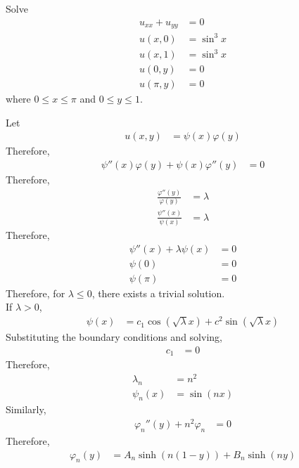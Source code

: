 \documentclass[titlepage, fleqn, a4paper, 12pt, twoside]{article}
\theoremstyle{definition}
\theoremstyle{theorem}
\begin{document}
\begin{question}
	Solve
	\begin{align*}
		u_{x x} + u_{y y} & = 0        \\
		u(x,0)            & = \sin^3 x \\
		u(x,1)            & = \sin^3 x \\
		u(0,y)            & = 0        \\
		u(\pi,y)          & = 0
	\end{align*}
	where $0 \le x \le \pi$ and $0 \le y \le 1$.
\end{question}

\begin{solution}
	Let
	\begin{align*}
		u(x,y) & = \psi(x) \varphi(y)
	\end{align*}
	Therefore,
	\begin{align*}
		\psi''(x) \varphi(y) + \psi(x) \varphi''(y) & = 0
	\end{align*}
	Therefore,
	\begin{align*}
		\frac{\varphi''(y)}{\varphi(y)} & = \lambda \\
		\frac{\psi''(x)}{\psi(x)}       & = \lambda
	\end{align*}
	Therefore,
	\begin{align*}
		\psi''(x) + \lambda \psi(x) & = 0 \\
		\psi(0)                     & = 0 \\
		\psi(\pi)                   & = 0
	\end{align*}
	Therefore, for $\lambda \le 0$, there exists a trivial solution.\\
	If $\lambda > 0$,
	\begin{align*}
		\psi(x) & = c_1 \cos\left( \sqrt{\lambda} x \right) + c^2 \sin\left( \sqrt{\lambda} x \right)
	\end{align*}
	Substituting the boundary conditions and solving,
	\begin{align*}
		c_1 & = 0
	\end{align*}
	Therefore,
	\begin{align*}
		\lambda_n & = n^2 \\
		\psi_n(x) & = \sin(n x)
	\end{align*}
	Similarly,
	\begin{align*}
		{\varphi_n}''(y) + n^2 \varphi_n & = 0
	\end{align*}
	Therefore,
	\begin{align*}
		\varphi_n(y) & = A_n \sinh\left( n (1 - y) \right) + B_n \sinh(n y)

\end{align*}
\end{solution}
\end{document}
